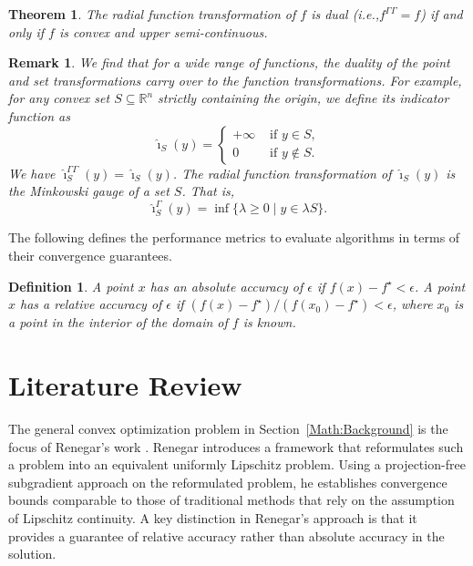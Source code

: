 \documentclass{article}
\newtheorem{theorem}{Theorem}[section]
\newtheorem{definition}{Definition}[section]
\newtheorem{remark}{Remark}[section]
\begin{document}
\begin{theorem}
    The radial function transformation of $f$ is dual (i.e.,$f^{\Gamma\Gamma} = f$) if and only if $f$ is convex and upper semi-continuous.
\end{theorem}

\begin{remark}
    We find that for a wide range of functions, the duality of the point and set transformations carry over to the function transformations.
    For example, for any convex set $S \subseteq \mathbb{R}^n$ strictly containing the origin, we define its indicator function as
    \[
    \hat{\imath}_S(y)= 
    \begin{cases}
        +\infty & \text { if } y \in S, \\ 0 & \text { if } y \notin S.
    \end{cases}
    \]
    We have $\hat{\imath}^{\Gamma\Gamma}_S(y) = \hat{\imath}_S(y)$. The radial function transformation of $\hat{\imath}_S(y)$ is the Minkowski gauge of a set $S$. That is,
    \[
    \hat{\imath}^{\Gamma}_S(y)= \inf\{\lambda \geq 0 \mid y \in \lambda S\}.
    \]
\end{remark}

The following defines the performance metrics to evaluate algorithms in terms of their convergence guarantees.

\begin{definition}
    A point $x$ has an absolute accuracy of $\epsilon$ if $f(x)-f^{\star}<\epsilon$. A point $x$ has a relative accuracy of $\epsilon$ if $\left(f(x)-f^{\star}\right)/\left(f(x_0)-f^{\star}\right)<\epsilon$,  where $x_0$ is a point in the interior of the domain of $f$ is known.
\end{definition}

\section{Literature Review} 
\label{sec:intro}

The general convex optimization problem in Section~\ref{Math:Background} is the focus of Renegar's work \cite{Renegar2016}. Renegar introduces a framework that reformulates such a problem into an equivalent uniformly Lipschitz problem. 
Using a projection-free subgradient approach on the reformulated problem, he establishes convergence bounds comparable to those of traditional methods that rely on the assumption of Lipschitz continuity. 
A key distinction in Renegar’s approach is that it provides a guarantee of relative accuracy rather than absolute accuracy in the solution. 
\end{document}
